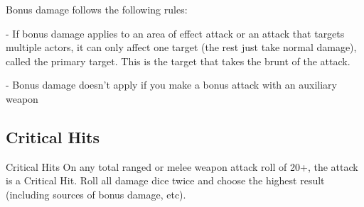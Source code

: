 Bonus damage follows the following rules:

         	- If bonus damage applies to an area of effect attack or an attack that targets multiple
         actors, it can only affect one target (the rest just take normal damage), called the primary
         target. This is the target that takes the brunt of the attack.

         	- Bonus damage doesn’t apply if you make a bonus attack with an auxiliary weapon

\subsection{Critical Hits}
                                                Critical Hits
On any total ranged or melee weapon attack roll of 20+, the attack is a Critical Hit. Roll all
damage dice twice and choose the highest result (including sources of bonus damage, etc).
